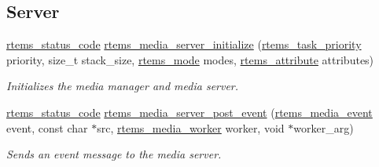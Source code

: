 \subsection*{Server}
\begin{DoxyCompactItemize}
\item 
\mbox{\hyperlink{group__ClassicStatus_ga545d41846817eaba6143d52ee4d9e9fe}{rtems\+\_\+status\+\_\+code}} \mbox{\hyperlink{group__RTEMSIOMedia_ga5e68a64fdea7ee2ea2de20376650afda}{rtems\+\_\+media\+\_\+server\+\_\+initialize}} (\mbox{\hyperlink{group__ClassicTasks_gaa80a0c0938307d1e99d0eb5fee765b47}{rtems\+\_\+task\+\_\+priority}} priority, size\+\_\+t stack\+\_\+size, \mbox{\hyperlink{group__ClassicModes_ga8d46a41a837840dc97336fdcd20e4f68}{rtems\+\_\+mode}} modes, \mbox{\hyperlink{group__ClassicAttributes_gaea40313cf78ed843e09c4315d0a10f79}{rtems\+\_\+attribute}} attributes)
\begin{DoxyCompactList}\small\item\em Initializes the media manager and media server. \end{DoxyCompactList}\item 
\mbox{\hyperlink{group__ClassicStatus_ga545d41846817eaba6143d52ee4d9e9fe}{rtems\+\_\+status\+\_\+code}} \mbox{\hyperlink{group__RTEMSIOMedia_gabe2acca9a30bcd62765c0b1c810ba89e}{rtems\+\_\+media\+\_\+server\+\_\+post\+\_\+event}} (\mbox{\hyperlink{group__RTEMSIOMedia_gadd58c5799ee997413d4d6be2ac05197b}{rtems\+\_\+media\+\_\+event}} event, const char $\ast$src, \mbox{\hyperlink{group__RTEMSIOMedia_ga4d3df16c316c9285e61bf0f735cafdd3}{rtems\+\_\+media\+\_\+worker}} worker, void $\ast$worker\+\_\+arg)
\begin{DoxyCompactList}\small\item\em Sends an event message to the media server. \end{DoxyCompactList}\end{DoxyCompactItemize}
